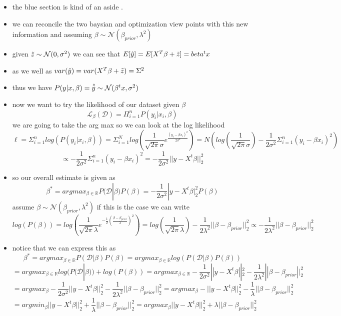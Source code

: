 \documentclass[12pt,twoside]{article}
\begin{document}
\begin{enumerate}
\begin{enumerate}
\begin{itemize}
\color{blue}
\item the blue section is kind of an aside . 
\item we can reconcile the two baysian and optimization view points with this new information and assuming $\beta\sim \mathcal{N}(\beta_{prior}, \lambda ^2)$
\item given $\Tilde{z}\sim \mathcal{N}(0,\sigma^2)$ we can see that $E[\hat{y}]=E[X^T\beta+\Tilde{z}]=beta^tx$
\item as we well as $var(\hat{y})=var(X^T\beta+\Tilde{z})=\Sigma^2$
\item thus we have $P(y|x,\beta)=\hat{\Tilde{y}}\sim \mathcal{N}(\beta^tx, \sigma^2)$
       \item now we want to try the likelihood of our dataset given $\beta$ 
       $$\mathcal{L}_{\beta}(\mathcal{D})=\Pi_{i=1}^{n}P(y_i|x_i,\beta)$$ we are going to take the arg max so we can look at the log likelihood 
$$\ell=\Sigma_{i=1}^{n}log(P(y_i|x_i,\beta))=\Sigma_{i=1}^{N}log(\frac{1}{\sqrt{2\pi}\sigma}e^{\frac{(y_i-\beta x_i)^2}{2\sigma ^2}})={N}(log(\frac{1}{\sqrt{2\pi}\sigma})-\frac{1}{2\sigma^2}\Sigma_{i=1}^{n}{(y_i-\beta x_i)^2})
$$ $$\propto-\frac{1}{2\sigma^2}\Sigma_{i=1}^{n}{(y_i-\beta x_i)^2}=-\frac{1}{2\sigma^2}||y-X^t\beta||_{2}^{2}$$ 
\item so our overall estimate is given as $$\beta^{*}=argmax_{\beta\in \mathbb{R}}P(\mathcal{D}|\beta)P(\beta)=-\frac{1}{2\sigma^2}|y-X^t\beta|_{2}^{2}P(\beta)$$
assume $\beta\sim \mathcal{N}(\beta_{prior}, \lambda^2)$ if this is the case we can write $$log(P(\beta))=log(\frac{1}{\sqrt{2\pi}\lambda}e^{-\frac{1}{2}(\frac{\beta-\beta_{prior}}{\lambda})^2})=log(\frac{1}{\sqrt{2\pi}\lambda})-\frac{1}{2\lambda^2}||\beta-\beta_{prior}||_{2}^{2}\propto-\frac{1}{2\lambda^2}||\beta-\beta_{prior}||_{2}^{2}$$ 
\item notice that we can express this as $$\beta^{*}=argmax_{\beta\in \mathbb{R}}P(\mathcal{D}|\beta)P(\beta)=argmax_{\beta\in \mathbb{R}}log(P(\mathcal{D}|\beta)P(\beta))$$$$= argmax_{\beta\in \mathbb{R}}log(P(\mathcal{D}|\beta))+log(P(\beta))=argmax_{\beta\in \mathbb{R}}-\frac{1}{2\sigma^2}||y-X^t\beta||_{2}^{2}-\frac{1}{2\lambda^2}||\beta-\beta_{prior}||_{2}^{2}$$$$=argmax_{\beta}-\frac{1}{2\sigma^2}||y-X^t\beta||_{2}^{2}-\frac{1}{2\lambda^2}||\beta-\beta_{prior}||_{2}^{2}=argmax_{\beta}-||y-X^t\beta||_{2}^{2}-\frac{1}{\lambda}||\beta-\beta_{prior}||_{2}^{2}$$ $$=argmin_{\beta}||y-X^t\beta||_{2}^{2}+\frac{1}{\lambda}||\beta-\beta_{prior}||_{2}^{2}=argmax_{\beta}||y-X^t\beta||_{2}^{2}+{\lambda}||\beta-\beta_{prior}||_{2}^{2}$$
\end{itemize}
   

\end{enumerate}
\end{enumerate}
\end{document}
